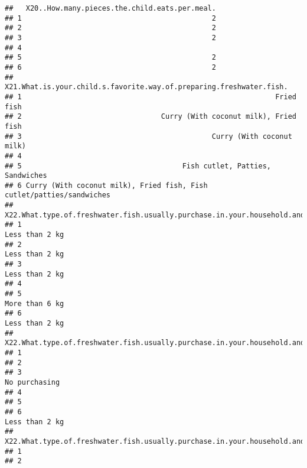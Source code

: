 \documentclass[
]{article}
\begin{document}
\begin{verbatim}
##   X20..How.many.pieces.the.child.eats.per.meal.
## 1                                             2
## 2                                             2
## 3                                             2
## 4                                              
## 5                                             2
## 6                                             2
##     X21.What.is.your.child.s.favorite.way.of.preparing.freshwater.fish.
## 1                                                            Fried fish
## 2                                 Curry (With coconut milk), Fried fish
## 3                                             Curry (With coconut milk)
## 4                                                                      
## 5                                      Fish cutlet, Patties, Sandwiches
## 6 Curry (With coconut milk), Fried fish, Fish cutlet/patties/sandwiches
##   X22.What.type.of.freshwater.fish.usually.purchase.in.your.household.and.how.much.per.month...Tilapia.
## 1                                                                                        Less than 2 kg
## 2                                                                                        Less than 2 kg
## 3                                                                                        Less than 2 kg
## 4                                                                                                      
## 5                                                                                        More than 6 kg
## 6                                                                                        Less than 2 kg
##   X22.What.type.of.freshwater.fish.usually.purchase.in.your.household.and.how.much.per.month...Korali.
## 1                                                                                                     
## 2                                                                                                     
## 3                                                                                        No purchasing
## 4                                                                                                     
## 5                                                                                                     
## 6                                                                                       Less than 2 kg
##   X22.What.type.of.freshwater.fish.usually.purchase.in.your.household.and.how.much.per.month...Hunga.
## 1                                                                                                    
## 2                                                                                                    

\end{verbatim}
\end{document}
